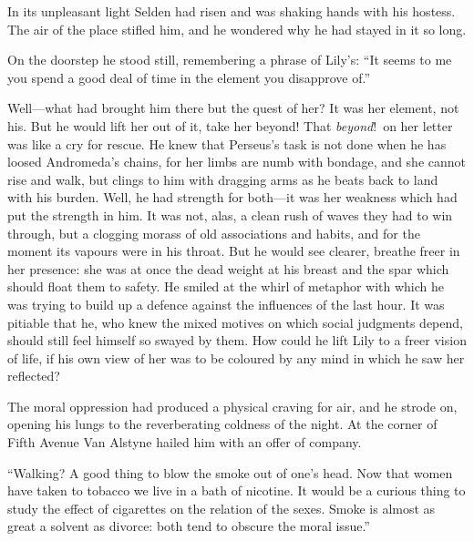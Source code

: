 \documentclass[12pt,a4paper]{book}
\begin{document}
In its unpleasant light Selden had risen and was shaking hands
with his hostess. The air of the place stifled him, and he
wondered why he had stayed in it so long.





On the doorstep he stood still, remembering a phrase of Lily's: 
``It seems to me you spend a good deal of time in the element you
disapprove of.''





Well---what had brought him there but the quest of her? It was her
element, not his. But he would lift her out of it, take her
beyond! That \textit{beyond}!\ on her letter was like a cry for rescue. He
knew that Perseus's task is not done when he has loosed
Andromeda's chains, for her limbs are numb with bondage, and she
cannot rise and walk, but clings to him with dragging arms as he
beats back to land with his burden. Well, he had strength for
both---it was her weakness which had put the strength in him. It
was not, alas, a clean rush of waves they had to win
through, but a clogging morass of old associations and habits,
and for the moment its vapours were in his throat. But he would
see clearer, breathe freer in her presence: she was at once the
dead weight at his breast and the spar which should float them to
safety. He smiled at the whirl of metaphor with which he was
trying to build up a defence against the influences of the last
hour. It was pitiable that he, who knew the mixed motives on
which social judgments depend, should still feel himself so
swayed by them. How could he lift Lily to a freer vision of life,
if his own view of her was to be coloured by any mind in which he
saw her reflected?





The moral oppression had produced a physical craving for air, and
he strode on, opening his lungs to the reverberating coldness of
the night. At the corner of Fifth Avenue Van Alstyne hailed him
with an offer of company.





``Walking? A good thing to blow the smoke out of one's head. Now
that women have taken to tobacco we live in a bath of nicotine. 
It would be a curious thing to study the effect of cigarettes on
the relation of the sexes. Smoke is almost as great a solvent as
divorce: both tend to obscure the moral issue.''
\end{document}
